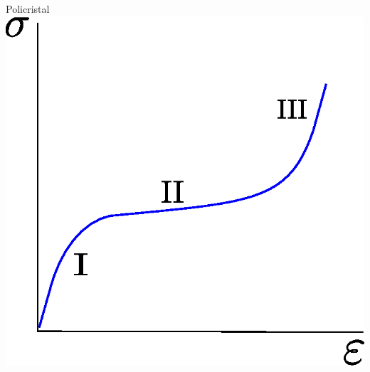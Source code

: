 \documentclass[usenames,dvipsnames]{beamer}
\begin{document}
\begin{frame}
\begin{columns}
\pause
\begin{block}{Policristal}
\includegraphics[height=0.35\textheight]{img/intro/SigmavsDefPoli.eps}
\end{block}

\end{columns}

 
\end{frame}
\end{document}

